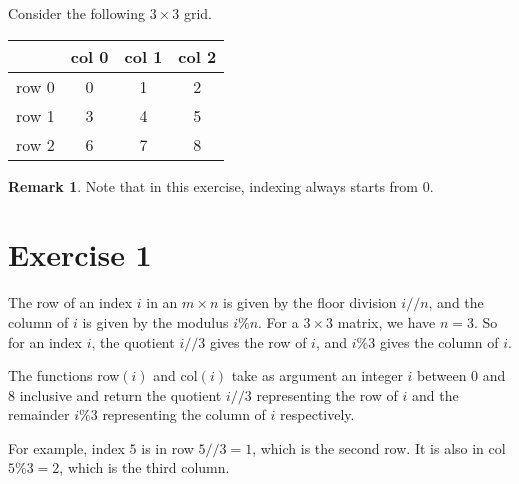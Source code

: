 \documentclass[12pt]{article}
\theoremstyle{definition}
\newtheorem{rem}[subsection]{Remark}
\begin{document}
Consider the following $3 \times 3$ grid.

\begin{center}
    \begin{tabular}{ c|ccc| } 
        &col 0 & col 1 & col 2\\
     \hline
     row 0&0 & 1 & 2 \\ 
     row 1&3& 4 &5\\ 
     row 2&6 & 7& 8\\ 
     \hline
    \end{tabular}
\end{center}

\begin{rem}
    Note that in this exercise, indexing always starts from 0.
\end{rem}
\section*{Exercise 1}
The row of an index $i$ in an $m \times n$ is given by the floor division $i//n$, and the column of $i$ is given by the modulus $i\% n$. For a $3 \times 3$ matrix,
we have $n=3$. So for an index $i$, the quotient $i//3$ gives the row of $i$, and $i \% 3$ gives the column of $i$.

The functions row$(i)$ and col$(i)$ take as argument an integer $i$ between $0$ and $8$ inclusive and return the quotient $i // 3$ representing the row of $i$ and the remainder $i \%3$ representing the column of $i$ respectively.

For example, index $5$ is in row $5//3 = 1$, which is the second row. It is also in col $5 \% 3 = 2$, which is the third column.
\end{document}
